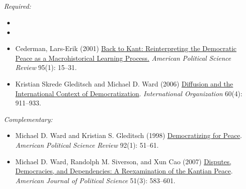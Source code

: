 \documentclass[12pt, a4paper]{article}
\begin{document}
\subsection*{{\color{red}{Session 4: Peace and democracies}}}




\noindent\textit{Required:}

\begin{itemize}
  \item
  \item
  \item Cederman, Lars-Erik (2001) \href{https://doi.org/10.1017/S0003055401000028}{Back to Kant: Reinterpreting the Democratic Peace as a Macrohistorical Learning Process.} \textit{American Political Science Review} 95(1): 15--31.
  \item Kristian Skrede Gleditsch and Michael D. Ward (2006) \href{https://doi.org/10.1017/S0020818306060309}{Diffusion and the International Context of Democratization}. \textit{International Organization} 60(4): 911--933.
\end{itemize}

\noindent\textit{Complementary:}

\begin{itemize}
  \item Michael D. Ward and Kristian S. Gleditsch (1998) \href{https://doi.org/10.2307/2585928}{Democratizing for Peace}. \textit{American Political Science Review} 92(1): 51--61.
  \item Michael D. Ward, Randolph M. Siverson, and Xun Cao (2007) \href{https://doi.org/10.1111/j.1540-5907.2007.00269.x}{Disputes, Democracies, and Dependencies: A Reexamination of the Kantian Peace}. \textit{American Journal of Political Science} 51(3): 583--601.
\end{itemize}
\end{document}
